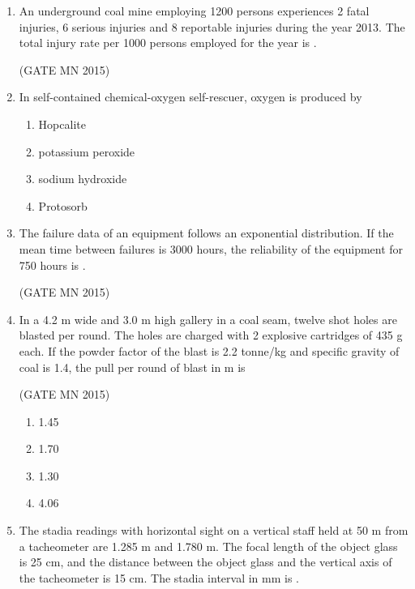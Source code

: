 \documentclass[journal]{IEEEtran}
\begin{document}
\begin{enumerate}
\item An underground coal mine employing 1200 persons experiences 2 fatal injuries, 6 serious injuries and 8 reportable injuries during the year 2013. The total injury rate per 1000 persons employed for the year is \underline{\hspace{2cm}}.  

	\hfill(GATE MN 2015)

\item In self-contained chemical-oxygen self-rescuer, oxygen is produced by  
\begin{multicols}{4}
\begin{enumerate}
\item Hopcalite  
\item potassium peroxide  
\item sodium hydroxide  
\item Protosorb  
\end{enumerate}
\end{multicols}

\item The failure data of an equipment follows an exponential distribution. If the mean time between failures is 3000 hours, the reliability of the equipment for 750 hours is \underline{\hspace{2cm}}.

	\hfill(GATE MN 2015)


\item In a 4.2 m wide and 3.0 m high gallery in a coal seam, twelve shot holes are blasted per round. The holes are charged with 2 explosive cartridges of 435 g each. If the powder factor of the blast is 2.2 tonne/kg and specific gravity of coal is 1.4, the pull per round of blast in m is  

	\hfill(GATE MN 2015)
\begin{multicols}{4}
\begin{enumerate}
\item 1.45  
\item 1.70  
\item 1.30  
\item 4.06  
\end{enumerate}
\end{multicols}

\item The stadia readings with horizontal sight on a vertical staff held at 50 m from a tacheometer are 1.285 m and 1.780 m. The focal length of the object glass is 25 cm, and the distance between the object glass and the vertical axis of the tacheometer is 15 cm. The stadia interval in mm is \underline{\hspace{2cm}}.  



\end{enumerate}
\end{document}
